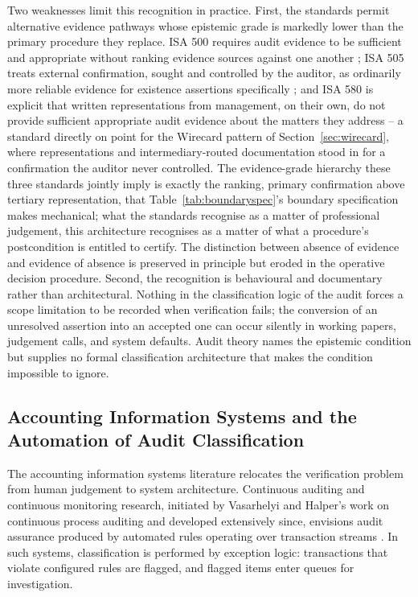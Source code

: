 \documentclass[11pt,a4paper]{article}
\theoremstyle{definition}
\theoremstyle{remark}
\begin{document}
Two weaknesses limit this recognition in practice. First, the standards permit alternative evidence pathways whose epistemic grade is markedly lower than the primary procedure they replace. ISA 500 requires audit evidence to be sufficient and appropriate without ranking evidence sources against one another \citep{isa500}; ISA 505 treats external confirmation, sought and controlled by the auditor, as ordinarily more reliable evidence for existence assertions specifically \citep{isa505}; and ISA 580 is explicit that written representations from management, on their own, do not provide sufficient appropriate audit evidence about the matters they address \citep{isa580} -- a standard directly on point for the Wirecard pattern of Section~\ref{sec:wirecard}, where representations and intermediary-routed documentation stood in for a confirmation the auditor never controlled. The evidence-grade hierarchy these three standards jointly imply is exactly the ranking, primary confirmation above tertiary representation, that Table~\ref{tab:boundaryspec}'s boundary specification makes mechanical; what the standards recognise as a matter of professional judgement, this architecture recognises as a matter of what a procedure's postcondition is entitled to certify. The distinction between absence of evidence and evidence of absence is preserved in principle but eroded in the operative decision procedure. Second, the recognition is behavioural and documentary rather than architectural. Nothing in the classification logic of the audit forces a scope limitation to be recorded when verification fails; the conversion of an unresolved assertion into an accepted one can occur silently in working papers, judgement calls, and system defaults. Audit theory names the epistemic condition but supplies no formal classification architecture that makes the condition impossible to ignore.

\subsection{Accounting Information Systems and the Automation of Audit Classification}
\label{sec:lit-ais}

The accounting information systems literature relocates the verification problem from human judgement to system architecture. Continuous auditing and continuous monitoring research, initiated by Vasarhelyi and Halper's work on continuous process auditing and developed extensively since, envisions audit assurance produced by automated rules operating over transaction streams \citep{vasarhelyi1991, kogan1999, alles2006}. In such systems, classification is performed by exception logic: transactions that violate configured rules are flagged, and flagged items enter queues for investigation.
\end{document}
